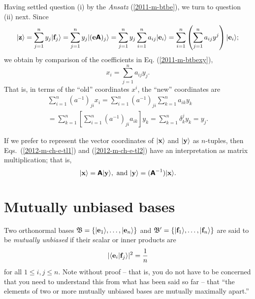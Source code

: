 Having settled question (i) by the {\it Ansatz}
(\ref{2011-m-btbe}),
we turn to question (ii) next.
Since
\begin{equation}
\vert {\bf z} \rangle  =
 \sum_{j=1}^n y_j  \vert {\bf f}_j \rangle =
 \sum_{j=1}^n  y_j\vert  ({\bf e}\textsf{\textbf{A}})_j \rangle =
 \sum_{j=1}^n  y_j  \sum_{i=1}^n a_{ij} \vert {\bf e}_i \rangle =
  \sum_{i=1}^n \left(\sum_{j=1}^n  a_{ij} y^j \right)  \vert  {\bf e}_i \rangle ;
\end{equation}
we obtain by comparison of the coefficients in Eq. (\ref{2011-m-btbexy}),
\begin{equation}
x_i= \sum_{j=1}^n a_{ij} y_j.
\label{2012-m-ch-e-tl1}
\end{equation}
That is, in terms of the ``old'' coordinates $x^i$,
the ``new'' coordinates are
\begin{equation}
\begin{split}
\sum_{i=1}^n (a^{-1})_{ji} x_i= \sum_{i=1}^n (a^{-1})_{ji}  \sum_{k=1}^n  a_{ik} y_k \\
=  \sum_{k=1}^n \left[ \sum_{i=1}^n (a^{-1})_{ji}  a_{ik} \right] y_k
=   \sum_{k=1}^n \delta^j_k y_k
=  y_j
.
\label{2012-m-ch-e-tl2}
\end{split}
\end{equation}

If we prefer to represent the vector coordinates of
$\vert {\bf x}\rangle $ and $\vert {\bf y}\rangle $ as $n$-tuples,
then Eqs.~(\ref{2012-m-ch-e-tl1})  and (\ref{2012-m-ch-e-tl2})
have an interpretation as matrix multiplication; that is,
\begin{equation}
\vert {\bf x}\rangle  =  \textsf{\textbf{A}}\vert {\bf y}\rangle , {\text{ and }}
\vert {\bf y}\rangle  =  (\textsf{\textbf{A}}^{-1})\vert {\bf x} \rangle
.
\label{2012-m-ch-e-tl3}
\end{equation}



\section{Mutually unbiased bases}

Two  orthonormal bases
${\frak B} =\{
\vert {\bf e}_1 \rangle ,
\ldots ,
\vert {\bf e}_n \rangle
\}$
and
${\frak B}'=\{
\vert {\bf f}_1 \rangle ,
\ldots ,
\vert {\bf f}_n  \rangle
\}$
are said to be {\em mutually unbiased}
if
their scalar or inner products are
\begin{equation}
\vert \langle {\bf e}_i\vert {\bf f}_j  \rangle \vert^2
=
\frac{1}{n}
\end{equation}
for all $1\le i,j\le n$.
Note without proof -- that is, you do not have to be concerned
that you need to understand  this from what has been said so far --
that ``the elements of two or more mutually unbiased bases are mutually maximally apart.''





